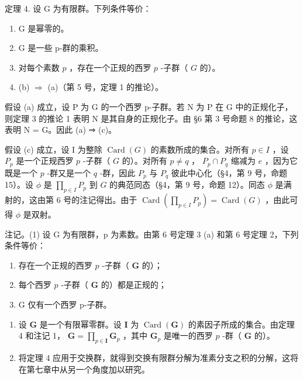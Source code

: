 定理 4. 设 G 为有限群。下列条件等价：

\begin{enumerate}
\def\labelenumi{(\alph{enumi})}
\item
  G 是幂零的。
\item
  G 是一些 p-群的乘积。
\item
  对每个素数 \(p\) ，存在一个正规的西罗 \(p\) -子群（ \(G\) 的）。
\item
  (b) \(\Rightarrow\) (a)（第 5 号，定理 1 的推论）。
\end{enumerate}

假设 (a) 成立，设 P 为 G 的一个西罗 p-子群。若 N 为 P 在 G 中的正规化子，则定理 3 的推论 1 表明 N 是其自身的正规化子。由 §6 第 3 号命题 8 的推论，这表明 N = G。因此 (a) ⇒ (c)。

假设 (c) 成立，设 I 为整除 \(\operatorname{Card}(G)\) 的素数所成的集合。对所有 \(p \in I\) ，设 \(P_p\) 是一个正规西罗 \(p\) -子群（ \(G\) 的）。对所有 \(p \neq q\) ， \(P_p \cap P_q\) 缩减为 \(e\) ，因为它既是一个 \(p\) -群又是一个 \(q\) -群，因此 \(P_p\) 与 \(P_q\) 彼此中心化（§4，第 9 号，命题 15）。设 \(\phi\) 是 \(\prod_{p \in I} P_p\) 到 \(G\) 的典范同态（§4，第 9 号，命题 12）。同态 \(\phi\) 是满射的，这由第 6 号的注记得出。由于 \(\operatorname{Card}\left(\prod_{p \in I} P_p\right) = \operatorname{Card}(G)\) ，由此可得 \(\phi\) 是双射。

注记。(1) 设 G 为有限群，p 为素数。由第 6 号定理 3 (a) 和第 6 号定理 2，下列条件等价：

\begin{enumerate}
\def\labelenumi{(\roman{enumi})}
\item
  存在一个正规的西罗 \(p\) -子群（ \(\mathbf{G}\) 的）；
\item
  每个西罗 \(p\) -子群（ \(\mathbf{G}\) 的）都是正规的；
\item
  G 仅有一个西罗 p-子群。
\end{enumerate}

\begin{enumerate}
\def\labelenumi{(\arabic{enumi})}
\setcounter{enumi}{1}
\item
  设 \(\mathbf{G}\) 是一个有限幂零群。设 \(\mathbf{I}\) 为 \(\operatorname{Card}(\mathbf{G})\) 的素因子所成的集合。由定理 4 和注记 1， \(\mathbf{G} = \prod_{p \in \mathbf{I}} \mathbf{G}_p\) ，其中 \(\mathbf{G}_p\) 是唯一的西罗 \(p\) -群（ \(\mathbf{G}\) 的）。
\item
  将定理 4 应用于交换群，就得到交换有限群分解为准素分支之积的分解，这将在第七章中从另一个角度加以研究。
\end{enumerate}

